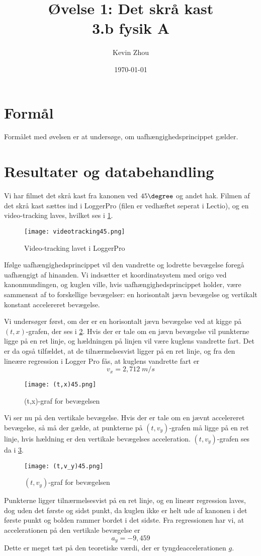 \documentclass{report}
\title{Øvelse 1: Det skrå kast\\
{\Large \textbf{3.b fysik A}}}
\author{Kevin Zhou}
\date{\today}
\begin{document}
\maketitle
\section*{Formål}
Formålet med øvelsen er at undersøge, om uafhængighedsprincippet gælder.
\section*{Resultater og databehandling}
Vi har filmet det skrå kast fra kanonen ved $45 \degree $ og andet hak.
Filmen af det skrå kast sættes ind i LoggerPro (filen er vedhæftet seperat i Lectio), og en video-tracking laves, hvilket ses i \cref{fig:tracking}.
\begin{figure}[H]
\begin{center}
  \texttt{[image: videotracking45.png]}
\end{center}
\caption{Video-tracking lavet i LoggerPro}
\label{fig:tracking}
\end{figure}
Ifølge uafhængighedsprincippet vil den vandrette og lodrette bevægelse foregå uafhængigt af hinanden.
Vi indsætter et koordinatsystem med origo ved kanonmundingen, og kuglen ville, hvis uafhængighedsprincippet holder, være sammensat af to forskellige bevægelser: en horisontalt jævn bevægelse og vertikalt konstant accelereret bevægelse.

Vi undersøger først, om der er en horisontalt jævn bevægelse ved at kigge på $(t,x)$-grafen, der ses i \cref{fig:tx}.
Hvis der er tale om en jævn bevægelse vil punkterne ligge på en ret linje, og hældningen på linjen vil være kuglens vandrette fart.
Det er da også tilfældet, at de tilnærmelsesvist ligger på en ret linje, og fra den lineære regression i Logger Pro fås, at kuglens vandrette fart er 
\[
v_x=2,712 \;\unit{m/s} 
\] 
\begin{figure}[H]
\begin{center}
  \texttt{[image: (t,x)45.png]}
\end{center}
  \caption{(t,x)-graf for bevægelsen}
  \label{fig:tx}
\end{figure}

Vi ser nu på den vertikale bevægelse.
Hvis der er tale om en jævnt accelereret bevægelse, så må der gælde, at punkterne på $(t,v_y)$-grafen må ligge på en ret linje, hvis hældning er den vertikale bevægelses acceleration.
$(t,v_y)$-grafen ses da i \cref{fig:tv_y}.
\begin{figure}[H]
\begin{center}
  \texttt{[image: (t,v\_y)45.png]}
\end{center}
  \caption{$(t,v_y)$-graf for bevægelsen}
\label{fig:tv_y}
\end{figure}
Punkterne ligger tilnærmelsesvist på en ret linje, og en lineær regression laves, dog uden det første og sidst punkt, da kuglen ikke er helt ude af kanonen i det første punkt og bolden rammer bordet i det sidste.
Fra regressionen har vi, at accelerationen på den vertikale bevægelse er 
\[
a_y=-9,459
\] 
Dette er meget tæt på den teoretiske værdi, der er tyngdeaccelerationen $g$.
\end{document}
